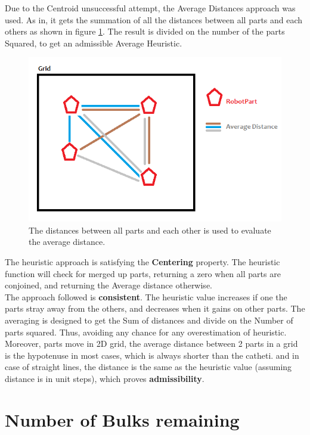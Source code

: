 Due to the Centroid unsuccessful attempt, the Average Distances approach was used. As in, it gets the summation of all the distances between all parts and each others as shown in figure \ref{fig:averagedistance}. The result is divided on the number of the parts Squared, to get an admissible Average Heuristic.

\begin{figure}[H] 
   	\centering
	\includegraphics[scale=0.6]{images/averagedistance} 
    \caption{The distances between all parts and each other is used to evaluate the average distance. }
    \label{fig:averagedistance} 
\end{figure}

The heuristic approach is satisfying the \textbf{Centering} property. The heuristic function will check for merged up parts, returning a zero when all parts are conjoined, and returning the Average distance otherwise. \\

The approach followed is \textbf{consistent}. The heuristic value increases if one the parts stray away from the others, and decreases when it gains on other parts. The averaging is designed to get the Sum of distances and divide on the Number of parts squared. Thus, avoiding any chance for any overestimation of heuristic. Moreover, parts move in 2D grid, the average distance between 2 parts in a grid is the hypotenuse in most cases, which is always shorter than the catheti. and in case of straight lines, the distance is the same as the heuristic value (assuming distance is in unit steps), which proves \textbf{admissibility}.	


\section{Number of Bulks remaining}

